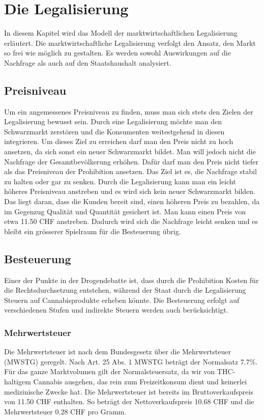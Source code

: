 \documentclass[../main.tex]{subfiles}
\begin{document}
	 \section{Die Legalisierung}
	 
	 In diesem Kapitel wird das Modell der marktwirtschaftlichen Legalisierung erläutert. 
	 Die marktwirtschaftliche Legalisierung verfolgt den Ansatz, den Markt so frei wie möglich zu gestalten. 
	 Es werden sowohl Auswirkungen auf die Nachfrage als auch auf den Staatshaushalt analysiert. 
	 
	 \subsection{Preisniveau}
	 
	 Um ein angemessenes Preisniveau zu finden, muss man sich stets den Zielen der Legalisierung bewusst sein. 
	 Durch eine Legalisierung möchte man den Schwarzmarkt zerstören und die Konsumenten weitestgehend in diesen integrieren. 
	 Um dieses Ziel zu erreichen darf man den Preis nicht zu hoch ansetzen, da sich sonst ein neuer Schwarzmarkt bildet. 
	 Man will jedoch nicht die Nachfrage der Gesamtbevölkerung erhöhen. 
	 Dafür darf man den Preis nicht tiefer als das Preisniveau der Prohibition ansetzen. 
	 Das Ziel ist es, die Nachfrage stabil zu halten oder gar zu senken.
	 Durch die Legalisierung kann man ein leicht höheres Preisniveau anstreben und es wird sich kein neuer Schwarzmarkt bilden. 
	 Das liegt daran, dass die Kunden bereit sind, einen höheren Preis zu bezahlen, da im Gegenzug Qualität und Quantität gesichert ist. 
	 Man kann einen Preis von etwa 11.50 CHF anstreben. 
	 Dadurch wird sich die Nachfrage leicht senken und es bleibt ein grösserer Spielraum für die Besteuerung übrig.
	 
	 \subsection{Besteuerung}
	 
	 Einer der Punkte in der Drogendebatte ist, dass durch die Prohibition Kosten für die Rechtsdurchsetzung entstehen, während der Staat durch die Legalisierung Steuern auf Cannabisprodukte erheben könnte. 
	 Die Besteuerung erfolgt auf verschiedenen Stufen und indirekte Steuern werden auch berücksichtigt.
	 
	 \subsubsection{Mehrwertsteuer}
	 Die Mehrwertsteuer ist nach dem Bundesgesetz über die Mehrwertsteuer (MWSTG) geregelt.
	 Nach Art. 25 Abs. 1 MWSTG beträgt der Normalsatz 7.7\%. 
	 Für das ganze Marktvolumen gilt der Normalsteuersatz, da wir von THC-haltigem Cannabis ausgehen, das rein zum Freizeitkonsum dient und keinerlei medizinische Zwecke hat. 
	 Die Mehrwertsteuer ist bereits im Bruttoverkaufspreis von 11.50 CHF enthalten. 
	 So beträgt der Nettoverkaufspreis 10.68 CHF und die Mehrwertsteuer 0.28 CHF pro Gramm. \\
	 
\end{document}
